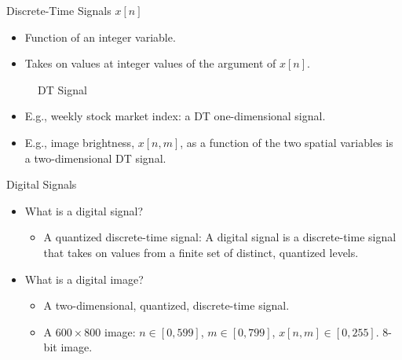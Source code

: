 %




\begin{frame}[plain]{Discrete-Time Signals $x[n]$}
    \begin{itemize}
        \item Function of an integer variable.
        \item Takes on values at integer values of the argument of $x[n]$.
    \end{itemize}
    \begin{figure}
      \centering
      
      \caption{DT Signal}\label{fi:dt_signal}
    \end{figure}
    \begin{itemize}
        \item E.g., weekly stock market index: a DT one-dimensional signal.
        \item E.g., image brightness,  $x[n,m]$,  as a function of the two spatial variables is a two-dimensional DT signal.
    \end{itemize}
\end{frame}

\begin{frame}{Digital Signals}
    \begin{itemize}
      \item What is a digital signal?
        \begin{itemize}
            \item A quantized discrete-time signal: A digital signal is a discrete-time signal that takes on values from a finite set of distinct, quantized levels.
        \end{itemize}

      \item What is a digital image?
        \begin{itemize}
            \item A two-dimensional, quantized, discrete-time signal.
            \item A $600 \times 800$ image: $n \in [0, 599]$, $m \in [0, 799]$, $x[n,m] \in [0,255]$. 8-bit image.
        \end{itemize}
    \end{itemize}
\end{frame}

